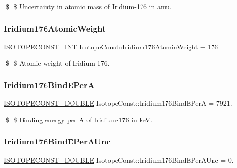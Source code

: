 \$ \$ Uncertainty in atomic mass of Iridium-\/176 in amu. \mbox{\label{group___isotope_const-_iridium-_ir176_ga9985649f41895f6317adb74c6a0c07bb}} 
\subsubsection{\texorpdfstring{Iridium176\+Atomic\+Weight}{Iridium176AtomicWeight}}
{\footnotesize\ttfamily \mbox{\hyperlink{group___isotope_const-_macros_ga5f18360b3e99483a35c32d789e62621c}{I\+S\+O\+T\+O\+P\+E\+C\+O\+N\+S\+T\+\_\+\+I\+NT}} Isotope\+Const\+::\+Iridium176\+Atomic\+Weight = 176}

\$ \$ Atomic weight of Iridium-\/176. \mbox{\label{group___isotope_const-_iridium-_ir176_gac8f8cf8a96252f28c40b0844c0026812}} 
\subsubsection{\texorpdfstring{Iridium176\+Bind\+E\+PerA}{Iridium176BindEPerA}}
{\footnotesize\ttfamily \mbox{\hyperlink{group___isotope_const-_macros_ga8f45a7272ce02c0b4c65c44636ed719a}{I\+S\+O\+T\+O\+P\+E\+C\+O\+N\+S\+T\+\_\+\+D\+O\+U\+B\+LE}} Isotope\+Const\+::\+Iridium176\+Bind\+E\+PerA = 7921.}

\$ \$ Binding energy per A of Iridium-\/176 in keV. \mbox{\label{group___isotope_const-_iridium-_ir176_ga1b6997e208db03914d7c1ccb43263e53}} 
\subsubsection{\texorpdfstring{Iridium176\+Bind\+E\+Per\+A\+Unc}{Iridium176BindEPerAUnc}}
{\footnotesize\ttfamily \mbox{\hyperlink{group___isotope_const-_macros_ga8f45a7272ce02c0b4c65c44636ed719a}{I\+S\+O\+T\+O\+P\+E\+C\+O\+N\+S\+T\+\_\+\+D\+O\+U\+B\+LE}} Isotope\+Const\+::\+Iridium176\+Bind\+E\+Per\+A\+Unc = 0.}

